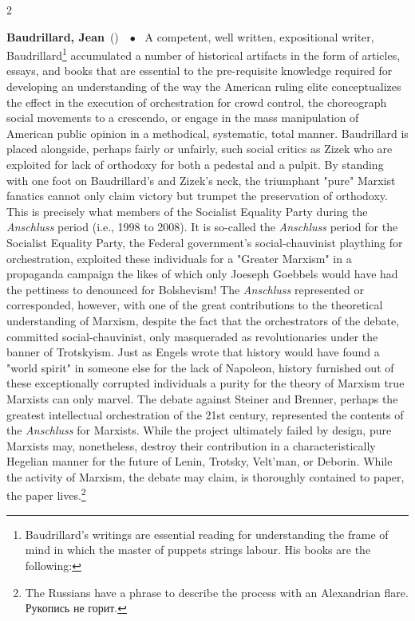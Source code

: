 \documentclass[10pt,a4paper,twoside]{article} %
\newcommand{\entry}[4]{\markboth{#1}{#1}\textbf{#1}\ {(#2)}\ \textit{#3}\ $\bullet$\ {#4}}  %
\begin{document}
\begin{multicols}{2}
\entry{Baudrillard, Jean} {} {} {} {A competent, well written, expositional writer, Baudrillard\footnote{Baudrillard's writings are essential reading for understanding the frame of mind in which the master of puppets strings labour. His books are the following: } accumulated a number of historical artifacts in the form of articles, essays, and books that are essential to the pre-requisite knowledge required for developing an understanding of the way the American ruling elite conceptualizes the effect in the execution of orchestration for crowd control, the choreograph social movements to a crescendo, or engage in the mass manipulation of American public opinion in a methodical, systematic, total manner. \newline \indent Baudrillard is placed alongside, perhaps fairly or unfairly, such social critics as Zizek who are exploited for lack of orthodoxy for both a pedestal and a pulpit. By standing with one foot on Baudrillard's and Zizek's neck, the triumphant "pure" Marxist fanatics cannot only claim victory but trumpet the preservation of orthodoxy. This is precisely what members of the Socialist Equality Party during the \emph{Anschluss} period (i.e., 1998 to 2008). It is so-called the \emph{Anschluss} period for the Socialist Equality Party, the Federal government's social-chauvinist plaything for orchestration, exploited these individuals for a "Greater Marxism" in a propaganda campaign the likes of which only Joeseph Goebbels would have had the pettiness to denounced for Bolshevism! The \emph{Anschluss} represented or corresponded, however, with one of the great contributions to the theoretical understanding of Marxism, despite the fact that the orchestrators of the debate, committed social-chauvinist, only masqueraded as revolutionaries under the banner of Trotskyism. Just as Engels wrote that history would have found a "world spirit" in someone else for the lack of Napoleon, history furnished out of these exceptionally corrupted individuals a purity for the theory of Marxism true Marxists can only marvel. The debate against Steiner and Brenner, perhaps the greatest intellectual orchestration of the 21st century, represented the contents of the \emph{Anschluss} for Marxists. While the project ultimately failed by design, pure Marxists may, nonetheless, destroy their contribution in a characteristically Hegelian manner for the future of Lenin, Trotsky, Velt'man, or Deborin. While the activity of Marxism, the debate may claim, is thoroughly contained to paper, the paper lives.\footnote{The Russians have a phrase to describe the process with an Alexandrian flare. \textrussian{Рукопись не горит}.}
}


\end{multicols}
\end{document}
